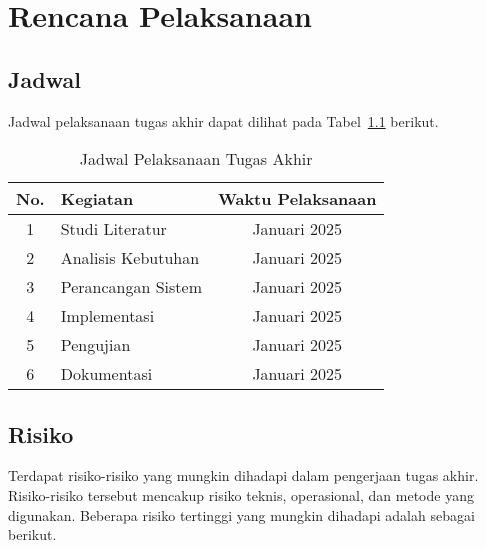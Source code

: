 
\chapter{Rencana Pelaksanaan}

\section{Jadwal}

Jadwal pelaksanaan tugas akhir dapat dilihat pada Tabel~\ref{tab:jadwal-pelaksanaan} berikut.

\begin{table}[!htbp]
    \centering
    \DefaultTableFormatting                
    \caption{Jadwal Pelaksanaan Tugas Akhir}
    \begin{tabularx}{\textwidth}{|c|X|c|}
        \hline
        \rowcolor[HTML]{EFEFEF}
        \textbf{No.} & \textbf{Kegiatan} & \textbf{Waktu Pelaksanaan} \\
        \hline
        \rowcolor[HTML]{FFFFFF}
        1 & Studi Literatur & Januari 2025 \\
        \hline
        \rowcolor[HTML]{F7F7F7}
        2 & Analisis Kebutuhan & Januari 2025 \\
        \hline
        \rowcolor[HTML]{FFFFFF}
        3 & Perancangan Sistem & Januari 2025 \\
        \hline
        \rowcolor[HTML]{F7F7F7}
        4 & Implementasi & Januari 2025 \\
        \hline
        \rowcolor[HTML]{FFFFFF}
        5 & Pengujian & Januari 2025 \\
        \hline
        \rowcolor[HTML]{F7F7F7}
        6 & Dokumentasi & Januari 2025 \\
        \hline
    \end{tabularx}
    \label{tab:jadwal-pelaksanaan}
\end{table}

\section{Risiko}

Terdapat risiko-risiko yang mungkin dihadapi dalam pengerjaan tugas akhir. Risiko-risiko tersebut mencakup risiko teknis, operasional, dan metode yang digunakan. Beberapa risiko tertinggi yang mungkin dihadapi adalah sebagai berikut.

